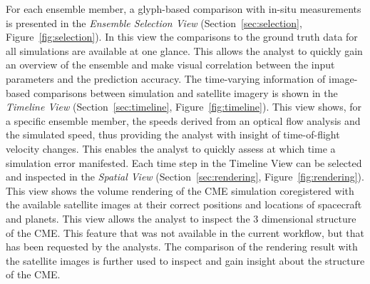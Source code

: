\documentclass[journal]{vgtc}                %
\begin{document}
For each ensemble member, a glyph-based comparison with in-situ measurements is presented in the \emph{Ensemble Selection View} (Section~\ref{sec:selection}, Figure~\ref{fig:selection}). In this view the comparisons to the ground truth data for all simulations are available at one glance. This allows the analyst to quickly gain an overview of the ensemble and make visual correlation between the input parameters and the prediction accuracy. The time-varying information of image-based comparisons between simulation and satellite imagery is shown in the \emph{Timeline View} (Section~\ref{sec:timeline}, Figure~\ref{fig:timeline}). This view shows, for a specific ensemble member, the speeds derived from an optical flow analysis and the simulated speed, thus providing the analyst with insight of time-of-flight velocity changes. This enables the analyst to quickly assess at which time a simulation error manifested. Each time step in the Timeline View can be selected and inspected in the \emph{Spatial View} (Section~\ref{sec:rendering}, Figure~\ref{fig:rendering}). This view shows the volume rendering of the CME simulation coregistered with the available satellite images at their correct positions and locations of spacecraft and planets. This view allows the analyst to inspect the 3 dimensional structure of the CME. This feature that was not available in the current workflow, but that has been requested by the analysts. The comparison of the rendering result with the satellite images is further used to inspect and gain insight about the structure of the CME.

\end{document}
